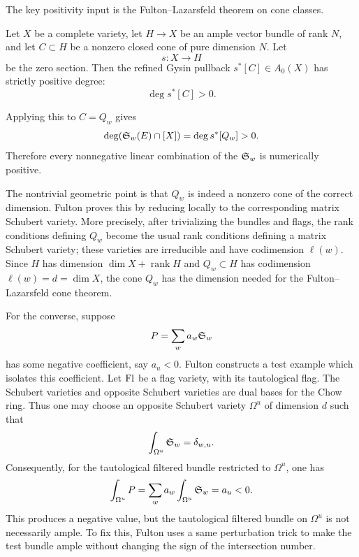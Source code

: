 \documentclass[12pt]{article}
\begin{document}
The key positivity input is the Fulton--Lazarsfeld theorem on cone classes.

\begin{theorem}
    Let $X$ be a complete variety, let $H\to X$ be an ample vector bundle of rank $N$, and let $C\subset H$ be a nonzero closed cone of pure dimension $N$. Let
    \[
        s:X\longrightarrow H
    \]
    be the zero section. Then the refined Gysin pullback $s^*[C]\in A_0(X)$
    has strictly positive degree:
    \[
        \deg s^*[C]>0.
    \]
\end{theorem}
Applying this to $C=Q_w$ gives
\[
    \deg(\mathfrak{S}_w(E)\cap [X])
    =
    \deg s^*[Q_w]
    >0.
\]
Therefore every nonnegative linear combination of the $\mathfrak{S}_w$ is numerically positive.

The nontrivial geometric point is that $Q_w$ is indeed a nonzero cone of the correct dimension. Fulton proves this by reducing locally to the corresponding matrix Schubert variety. More precisely, after trivializing the bundles and flags, the rank conditions defining $Q_w$ become the usual rank conditions defining a matrix Schubert variety; these varieties are irreducible and have codimension $\ell(w)$. Since $H$ has dimension $\dim X+\operatorname{rank}H$ and $Q_w\subset H$ has codimension $\ell(w)=d=\dim X$, the cone $Q_w$ has the dimension needed for the Fulton--Lazarsfeld cone theorem.

For the converse, suppose
\[
    P=\sum_w a_w\mathfrak{S}_w
\]
has some negative coefficient, say $a_u<0$. Fulton constructs a test example which isolates this coefficient. Let $\operatorname{Fl}$ be a flag variety, with its tautological flag. The Schubert varieties and opposite Schubert varieties are dual bases for the Chow ring. Thus one may choose an opposite Schubert variety $\Omega^u$ of dimension $d$ such that
\[
    \int_{\Omega^u} \mathfrak{S}_w = \delta_{w,u}.
\]
Consequently, for the tautological filtered bundle restricted to $\Omega^u$, one has
\[
    \int_{\Omega^u} P
    =
    \sum_w a_w\int_{\Omega^u}\mathfrak{S}_w
    =
    a_u<0.
\]
This produces a negative value, but the tautological filtered bundle on $\Omega^u$ is not necessarily ample. To fix this, Fulton uses a same perturbation trick to make the test bundle ample without changing the sign of the intersection number.

\end{document}
